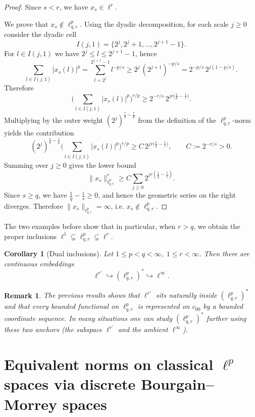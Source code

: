 \documentclass[preprint,12pt]{elsarticle}
\newtheorem{corollary}{Corollary}[theorem]
\newtheorem{remark}[theorem]{Remark}
\begin{document}
\begin{proof}
Since $s<r$, we have $x_s\in \ell^{r}$.

We prove that $x_s\notin \ell^{p}_{q,r}$. Using the dyadic decomposition, for each scale $j\ge0$ consider the dyadic cell
\[
I(j,1)=\{2^{j},2^{j}+1,\dots,2^{j+1}-1\}.
\]
For $l\in I(j,1)$ we have $2^{j}\le l\le 2^{j+1}-1$, hence
\[
\sum_{l\in I(j,1)}|x_{s}(l)|^{p}
=\sum_{l=2^{j}}^{2^{j+1}-1} l^{-p/s}
\ge 2^{j}\,(2^{j+1})^{-p/s}
=2^{-p/s}\,2^{j(1-p/s)}.
\]
Therefore
\[
\Big(\sum_{l\in I(j,1)}|x_{s}(l)|^{p}\Big)^{r/p}
\ge 2^{-r/s}\,2^{j r\big(\frac{1}{p}-\frac{1}{s}\big)}.
\]
Multiplying by the outer weight $(2^{j})^{\frac{r}{q}-\frac{r}{p}}$ from the definition of the $\ell^{p}_{q,r}$-norm yields the contribution
\[
(2^{j})^{\frac{r}{q}-\frac{r}{p}}
\Big(\sum_{l\in I(j,1)}|x_{s}(l)|^{p}\Big)^{r/p}
\ge C\,2^{j r\big(\frac{1}{q}-\frac{1}{s}\big)},
\qquad C:=2^{-r/s}>0.
\]
Summing over $j\ge0$ gives the lower bound
\[
\|x_{s}\|_{\ell^{p}_{q,r}}^{r}
\ge C\sum_{j\ge0}2^{j r(\frac{1}{q}-\frac{1}{s})}.
\]
Since $s\ge q$, we have $\frac{1}{q}-\frac{1}{s}\ge0$, and hence the geometric series on the right diverges. Therefore
$\|x_{s}\|_{\ell^{p}_{q,r}}=\infty$, i.e. $x_{s}\notin\ell^{p}_{q,r}$.
\end{proof}


The two examples before show that in particular, when $r>q$, we obtain the proper inclusions  $\ell^{1}\subsetneq \ell^{p}_{q,r}\subsetneq \ell^{r}$.


\begin{corollary}[Dual inclusions]
Let $1\le p<q<\infty,\; 1\leq r<\infty$. Then there are continuous embeddings
\[
\ell^{r'} \hookrightarrow (\ell^p_{q,r})^{*} \hookrightarrow \ell^\infty.
\]
\end{corollary}


\begin{remark}
The previous results shows that \(\ell^{r'}\) sits naturally inside \((\ell^p_{q,r})^{*}\) and that every bounded functional on \(\ell^p_{q,r}\) is represented on \(c_{00}\) by a bounded coordinate sequence. In many situations one can study \((\ell^p_{q,r})^{*}\) further using these two anchors (the subspace \(\ell^{r'}\) and the ambient \(\ell^\infty\)).
\end{remark}


\section{Equivalent norms on classical $\ell^p$ spaces via discrete Bourgain–Morrey spaces}
\end{document}
